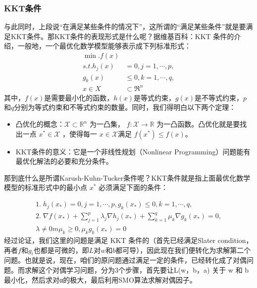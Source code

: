 \documentclass[a4paper,12pt]{article}
\begin{document}
\subsubsection{KKT条件}
与此同时，上段说“在满足某些条件的情况下”，这所谓的“满足某些条件”就是要满足KKT条件。那KKT条件的表现形式是什么呢？据维基百科：KKT 条件的介绍，一般地，一个最优化数学模型能够表示成下列标准形式：
\begin{equation}
\begin{split}
  \min.f(x)\\
  s.t. h_j(x)&=0,j=1,\cdots,p,\\
  g_k(x)&\leq0,k=1,\cdots,q,\\
  x\in X&\subset\Re^n
\end{split}
\end{equation}
其中，$f(x)$是需要最小化的函数，$h(x)$是等式约束，$g(x)$是不等式约束，$p$和$q$分别为等式约束和不等式约束的数量。同时，我们得明白以下两个定理：
\begin{itemize}
  \item 凸优化的概念：$\mathcal{X} \subset \mathbb{R}^n$ 为一凸集， $f:\mathcal{X}\to \mathbb{R}$ 为一凸函数。凸优化就是要找出一点 $x^\ast \in \mathcal{X}$ ，使得每一 $x \in \mathcal{X} $满足 $f(x^\ast)\le f(x) $。
  \item KKT条件的意义：它是一个非线性规划（Nonlinear Programming）问题能有最优化解法的必要和充分条件。
\end{itemize}

那到底什么是所谓Karush-Kuhn-Tucker条件呢？KKT条件就是指上面最优化数学模型的标准形式中的最小点 $x^*$ 必须满足下面的条件：

\begin{equation}
  \begin{split}
  1.\;h_j(x_*)=0,j=1,\cdots,p,g_k(x_*)\leq0,k=1,\cdots,q,\\
  2.\;\nabla f(x_*)+\sum_{j=1}^p\lambda_j\nabla h_j(x_*)+\sum_{k=1}^q\mu_k\nabla g_k(x_*)=0,\\
  \lambda\neq0m\mu_k\geq0,\mu_kg_k(x_*)=0
\end{split}
\end{equation}
经过论证，我们这里的问题是满足 KKT 条件的（首先已经满足Slater condition，再者$f$和$g_i$也都是可微的，即$L$对$w$和$b$都可导），因此现在我们便转化为求解第二个问题。也就是说，现在，咱们的原问题通过满足一定的条件，已经转化成了对偶问题。而求解这个对偶学习问题，分为3个步骤，首先要让L(w，b，a) 关于 w 和 b 最小化，然后求对α的极大，最后利用SMO算法求解对偶因子。
\end{document}
